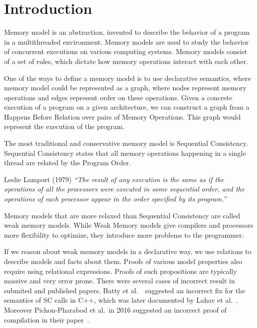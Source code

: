 \section{Introduction}

Memory model is an abstraction, invented to describe the behavior of a program in a multithreaded environment. Memory models are used to study the behavior of concurrent executions on various computing systems. Memory models consist of a set of rules, which dictate how memory operations interact with each other. 

One of the ways to define a memory model is to use declarative semantics, where memory model could be represented as a graph, where nodes represent memory operations and edges represent order on these operations. Given a concrete execution of a program on a given architecture, we can construct a graph from a Happens Before Relation over pairs of Memory Operations. This graph would represent the execution of the program.  

The most traditional and conservative memory model is Sequential Consistency. Sequential Consistency states that all memory operations happening in a single thread are related by the Program Order. 
\begin{aquote}{Leslie Lamport (1979)}
    \textit{``The result of any execution is the same as if the
    operations of all the processors were executed in
    some sequential order, and the operations of each
    processor appear in the order specified by its
    program.''}
\end{aquote}

Memory models that are more relaxed than Sequential Consistency are called weak memory models. While Weak Memory models give compilers and processors more flexibility to optimize, they introduce more problems to the programmer. 


If we reason about weak memory models in a declarative way, we use relations to describe models and facts about them. Proofs of various model properties also require using relational expressions. Proofs of such propositions are typically massive and very error prone. There were several cases of incorrect result in submited and published papers. Batty et al.~\cite{batty_2016}\ suggested an incorrect fix for the semantics of SC calls in C++, which was later documented by Lahav et al.~\cite{lahav2017repairing}. Moreover Pichon-Pharabod et al.\  in 2016 suggested an incorrect proof of compilation in their paper~\cite{PichonPharabod_Sewell16}. 

